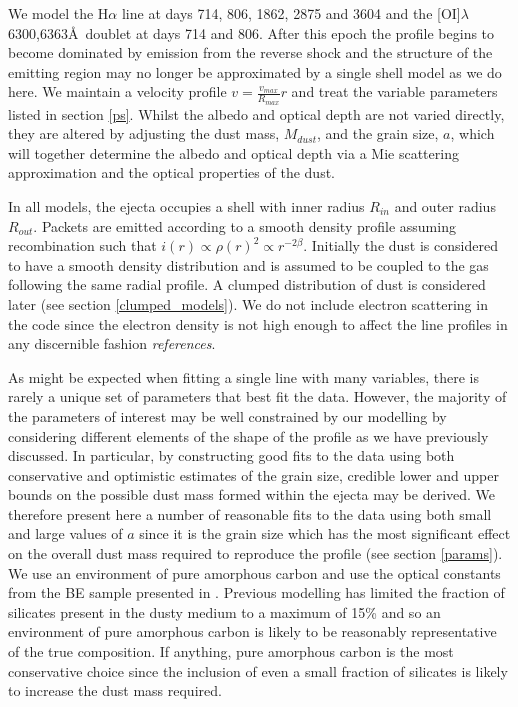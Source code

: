 \documentclass[useAMS,usenatbib,usegraphicx]{mnras}
\begin{document}
We model the H$\alpha$ line at days 714, 806, 1862, 2875 and 3604 and the [OI]$\lambda$6300,6363\AA\ doublet at days 714 and 806.  After this epoch the profile begins to become dominated by emission from the reverse shock and the structure of the emitting region may no longer be approximated by a single shell model as we do here.  We maintain a velocity profile $v = \frac{v_{max}}{R_{max}}r$ and treat the variable parameters listed in section \ref{ps}.  Whilst the albedo and optical depth are not varied directly, they are altered by adjusting the dust mass, $M_{dust}$, and the grain size, $a$, which will together determine the albedo and optical depth via a Mie scattering approximation and the optical properties of the dust.  

In all models, the ejecta occupies a shell with inner radius $R_{in}$ and outer radius $R_{out}$.  Packets are emitted according to a smooth density profile assuming recombination such that $i(r) \propto \rho(r)^2 \propto r^{-2\beta}$.  Initially the dust is considered to have a smooth density distribution and is assumed to be coupled to the gas following the same radial profile.  A clumped distribution of dust is considered later (see section \ref{clumped_models}).  We do not include electron scattering in the code since the electron density is not high enough to affect the line profiles in any discernible fashion \textit{references}.

As might be expected when fitting a single line with many variables, there is rarely a unique set of parameters that best fit the data.  However, the majority of the parameters of interest may be well constrained by our modelling by considering different elements of the shape of the profile as we have previously discussed.   In particular, by constructing good fits to the data using both conservative and optimistic estimates of the grain size, credible lower and upper bounds on the possible dust mass formed within the ejecta may be derived.  We therefore present here a number of reasonable fits to the data using both small and large values of $a$ since it is the grain size which has the most significant effect on the overall dust mass required to reproduce the profile (see section \ref{params}).  We use an environment of pure amorphous carbon and use the optical constants from the BE sample presented in \citet{Zubko1996}.  Previous modelling has limited the fraction of silicates present in the dusty medium to a maximum of 15\% \citep{Wesson2015,Ercolano2007} and so an environment of pure amorphous carbon is likely to be reasonably representative of the true composition.  If anything, pure amorphous carbon is the most conservative choice since the inclusion of even a small fraction of silicates is likely to increase the dust mass required. 
\end{document}
